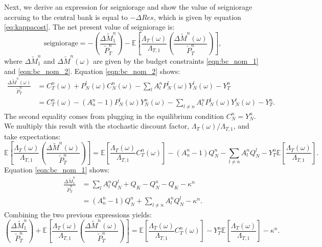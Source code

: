Next, we derive an expression for seigniorage and show the value of
seigniorage accruing to the central bank is equal to $-\Delta Res$,
which is given by equation \eqref{eq:kappacost}. The net present value
of seigniorage is:
\begin{equation*}
  \text{seigniorage} = 
  - \left(\frac{\Delta \tilde{M}^n_1 }{\tilde{P}^n_T}\right)
  - \mathbb{E}\left[ \frac{\Lambda_T(\omega)}{\Lambda_{T, 1}} 
    \left(\frac{\Delta \tilde{M}^n(\omega)}{\tilde{P}^n_T}\right)
  \right],
\end{equation*}
where $\Delta \tilde M^n_1$ and $\Delta \tilde M^n(\omega)$ are given
by the budget constraints \eqref{eqn:bc_nom_1} and
\eqref{eqn:bc_nom_2}. Equation \eqref{eqn:bc_nom_2} shows:
\begin{align*}
  \frac{\Delta \tilde{M}^n(\omega)}{\tilde{P}^n_T}
  & = C^n_T(\omega) + P^l_N(\omega) C^n_N(\omega)
    - \sum_l A^n_l P^l_N(\omega) Y^l_N(\omega) -  Y^n_T \\
  & = C^n_T(\omega) - \left( A^n_n - 1 \right) P^l_N(\omega) Y^n_N(\omega)
    - \sum_{l \neq n} A^n_l P^l_N(\omega) Y^l_N(\omega) - Y^n_T.
\end{align*}
The second equality comes from plugging in the equilibrium condition
$C^n_N = Y^n_N$. We multiply this result with the stochastic discount
factor, $\Lambda_T(\omega) / \Lambda_{T, 1}$, and take expectations:
\begin{equation*}
  \mathbb{E}\left[ 
    \frac{\Lambda_T(\omega)}{\Lambda_{T, 1}}
    \left( \frac{\Delta \tilde{M}^n(\omega)}{\tilde{P}^n_T} \right)
  \right] = \mathbb{E}\left[ 
    \frac{\Lambda_T(\omega)}{\Lambda_{T, 1}} C^n_T(\omega) 
  \right] - \left( A^n_n - 1 \right) Q^n_N - \sum_{l \neq n} A^n_l Q^l_N -
  Y^n_T \mathbb{E}\left[ \frac{\Lambda_T(\omega)}{\Lambda_{T, 1}} \right].
\end{equation*}
Equation \eqref{eqn:bc_nom_1} shows:
\begin{align*}
  \frac{\Delta \tilde{M}^n_1}{\tilde{P}^n_T}
  & = \sum_l A^n_l Q^l_N + Q_K - Q^n_N - Q_K - \kappa^n   \\
  & = \left( A^n_n - 1 \right) Q^n_N + \sum_{l \neq n} A^n_l Q^l_N - \kappa^n. 
\end{align*}
Combining the two previous expressions yields:
\begin{equation*}
  \left(\frac{\Delta \tilde{M}^n_1}{\tilde{P}^n_T}\right) + 
  \mathbb{E}\left[  
    \frac{\Lambda_T(\omega)}{\Lambda_{T, 1}}
    \left( \frac{\Delta \tilde{M}^n(\omega)}{\tilde{P}^n_T} \right)
  \right] =
  \mathbb{E}\left[ \frac{\Lambda_T(\omega)}{\Lambda_{T, 1}} C^n_T(\omega) \right]
  -  Y^n_T \mathbb{E}\left[\frac{\Lambda_T(\omega)}{\Lambda_{T, 1}} \right]
  - \kappa^n.   
\end{equation*}
